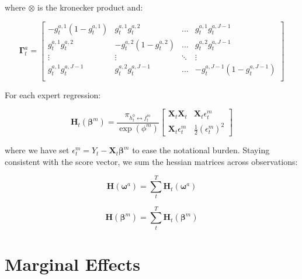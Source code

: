 \documentclass[12pt]{article}
\newcommand{\Ht}[1]{\mathbf{H}_{t}(#1)}
\newcommand{\HH}[1]{\boldsymbol{H}(#1)}
\newcommand{\gateprod}[2]{\pi_{#1 \longleftrightarrow #2}}
\begin{document}
where $\otimes$ is the kronecker product and:

\begin{equation}
  \boldsymbol{\Gamma}^{a}_{t} = \begin{bmatrix}
  -g_{t}^{a,1}(1-g_{t}^{a,1}) & g_{t}^{a,1}g_{t}^{a,2}      & \dots  & g_{t}^{a,1}g_{t}^{a,J-1}        \\
  g_{t}^{a,1}g_{t}^{a,2}      & -g_{t}^{a,2}(1-g_{t}^{a,2}) & \dots  & g_{t}^{a,2}g_{t}^{a,J-1}        \\
  \vdots                      &  \vdots                     & \ddots & \vdots                          \\
  g_{t}^{a,1}g_{t}^{a,J-1}    & g_{t}^{a,2}g_{t}^{a,J-1}    & \dots  & -g_{t}^{a,J-1}(1-g_{t}^{a,J-1}) \\
    \end{bmatrix}
\end{equation}

For each expert regression:


\begin{equation}
  \Ht{\boldsymbol{\beta}^{m}} = \frac{\gateprod{h^{0}_{t}}{f^{m}_{t}}}{\exp{(\phi^{m})}} \begin{bmatrix}
  \boldsymbol{X}_{t} \boldsymbol{X}_{t}     &  \boldsymbol{X}_{t} \epsilon^{m}_{t}     \\
  \boldsymbol{X}_{t} \epsilon^{m}_{t}       &  \frac{1}{2} (\epsilon^{m}_{t})^{2}
    \end{bmatrix}
\end{equation}

where we have set $\epsilon^{m}_{t} = Y_{t} - \boldsymbol{X}_{t} \boldsymbol{\beta}^{m}$
to ease the notational burden. Staying consistent with the score vector, we
sum the hessian matrices across observations:

\begin{equation}
  \HH{\boldsymbol{\omega}^{a}} = \sum_{t}^{T} \Ht{\boldsymbol{\omega}^{a}}
\end{equation}


\begin{equation}
  \HH{\boldsymbol{\beta}^{m}} = \sum_{t}^{T} \Ht{\boldsymbol{\beta}^{m}}
\end{equation}



\section{Marginal Effects} \label{sec:MarginalEffects}
\end{document}
